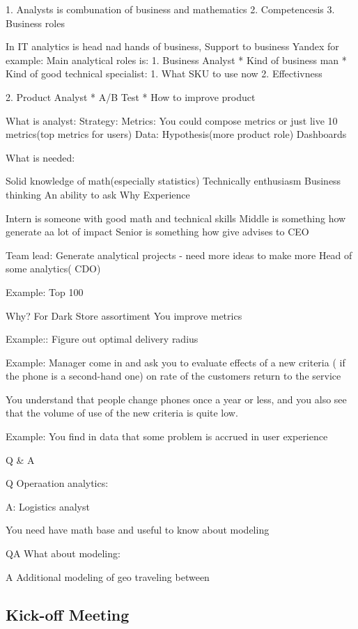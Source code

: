 \documentclass[12pt, a4paper, oneside]{article}
\begin{document}
1. Analysts is combunation of business and mathematics 
2. Competencesis
3. Business roles


In IT analytics is head nad hands of business, 
Support to business 
Yandex for example: 
Main analytical roles is:
1. Business Analyst
* Kind of business man
* Kind of good technical specialist:
    1. What SKU to use now
    2. Effectivness

2. Product Analyst
* A/B Test
* How to improve product 

What is analyst:
Strategy:
Metrics: You could compose metrics or just live 10 metrics(top metrics for users) 
Data:
Hypothesis(more product role)
Dashboards

What is needed:


Solid knowledge of math(especially statistics) 
Technically enthusiasm
Business thinking
An ability to  ask Why
Experience 

Intern is someone with good math and technical skills
Middle is something how generate aa lot of impact
Senior is something how give advises to CEO

Team lead: Generate analytical projects - need more ideas to make more 
Head of some analytics( CDO) 

Example: Top 100

Why? For Dark Store assortiment 
You improve metrics

Example:: Figure out optimal delivery radius 

Example: Manager come in and ask you to  evaluate effects of a new criteria ( if the phone is a second-hand one) on rate of the customers return to the service 

You understand that people change phones once a year or less, and you also see that the volume of use of the new criteria is quite low.


Example:
You find in data that some problem is accrued in user experience 


Q & A

Q Operaation analytics:

A: Logistics analyst 

You need have math base and useful to know about modeling 


QA What about modeling: 

A 
Additional modeling of geo traveling between 
\subsection{Kick-off Meeting}
\end{document}
